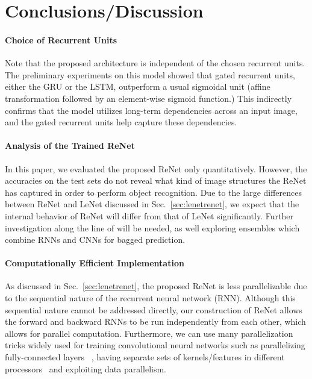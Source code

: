 \section{Conclusions/Discussion}

\paragraph{Choice of Recurrent Units}
Note that the proposed architecture is independent of the chosen recurrent
units. The preliminary experiments on this model showed that gated recurrent
units, either the GRU or the LSTM, outperform a usual sigmoidal unit (affine
transformation followed by an element-wise sigmoid function.) This indirectly
confirms that the model utilizes long-term dependencies across an input image,
and the gated recurrent units help capture these dependencies.

\paragraph{Analysis of the Trained ReNet}
In this paper, we evaluated the proposed ReNet only quantitatively. However, the
accuracies on the test sets do not reveal what kind of image structures the
ReNet has captured in order to perform object recognition. Due to the large
differences between ReNet and LeNet discussed in
Sec.~\ref{sec:lenetrenet}, we expect that the internal behavior of ReNet
will differ from that of LeNet significantly. Further investigation along
the line of \citep{ZeilerFergus14} will be needed, as well exploring ensembles
which combine RNNs and CNNs for bagged prediction.

\paragraph{Computationally Efficient Implementation}
As discussed in Sec.~\ref{sec:lenetrenet}, the proposed ReNet is less
parallelizable due to the sequential nature of the recurrent neural network
(RNN). Although this sequential nature cannot be addressed directly, our
construction of ReNet allows the forward and backward RNNs to be run
independently from each other, which allows for parallel computation.
Furthermore, we can use many parallelization tricks widely used for training
convolutional neural networks such as parallelizing fully-connected layers
~\citep{krizhevsky2014one}, having separate sets of kernels/features in
different processors~\citep{Krizhevsky-2012} and exploiting data parallelism.


